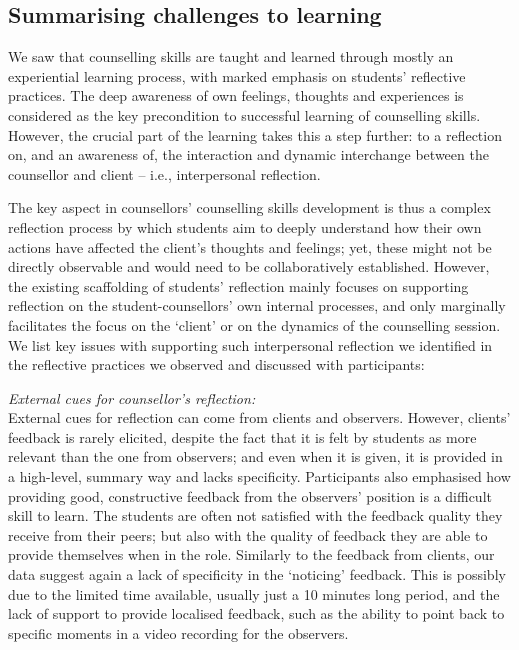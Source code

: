 \documentclass{sigchi}
\begin{document}
\subsection{Summarising challenges to learning}
We saw that counselling skills are taught and learned through mostly an experiential learning process, with marked emphasis on students' reflective practices. The deep awareness of own feelings, thoughts and experiences is considered as the key precondition to successful learning of counselling skills. However, the crucial part of the learning takes this a step further: to a reflection on, and an awareness of, the interaction and dynamic interchange between the counsellor and client -- i.e., interpersonal reflection. 

The key aspect in counsellors' counselling skills development is thus a complex reflection process by which students aim to deeply understand how their own actions have affected the client's thoughts and feelings; yet, these might not be directly observable and would need to be collaboratively established. However, the existing scaffolding of students' reflection mainly focuses on supporting reflection on the student-counsellors' own internal processes, and only marginally facilitates the focus on the `client' or on the dynamics of the counselling session. We list key issues with supporting such interpersonal reflection we identified in the reflective practices we observed and discussed with participants:

\emph{External cues for counsellor's reflection:}\\
External cues for reflection can come from clients and observers. However, clients' feedback is rarely elicited, despite the fact that it is felt by students as more relevant than the one from observers; and even when it is given, it is provided in a high-level, summary way and lacks specificity. Participants also emphasised how providing good, constructive feedback from the observers' position is a difficult skill to learn. The students are often not satisfied with the feedback quality they receive from their peers; but also with the quality of feedback they are able to provide themselves when in the role. Similarly to the feedback from clients, our data suggest again a lack of specificity in the `noticing' feedback. This is possibly due to the limited time available, usually just a 10 minutes long period, and the lack of support to provide localised feedback, such as the ability to point back to specific moments in a video recording for the observers.  
\end{document}
